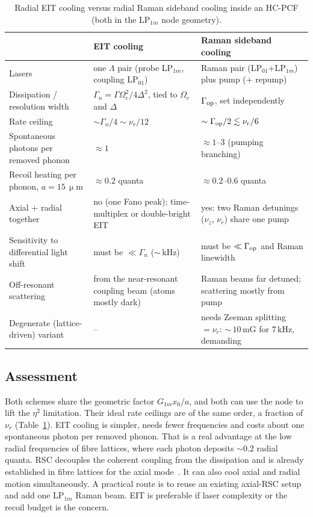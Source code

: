 \documentclass[11pt,a4paper]{article}
\newcommand{\micrometre}{\upmu m}\newcommand{\microkelvin}{\upmu K}
\newcommand{\SI}[2]{\ensuremath{#1\,\mathrm{#2}}}
\newcommand{\Om}{\Omega}
\begin{document}
\begin{table}[t]
\centering
\caption{Radial EIT cooling versus radial Raman sideband cooling inside an HC-PCF (both in the LP$_{1m}$ node geometry).}
\label{tab:compare}
\small
\begin{tabular}{p{4.0cm}p{5.2cm}p{5.2cm}}
\toprule
& EIT cooling & Raman sideband cooling\\
\midrule
Lasers & one $\Lambda$ pair (probe LP$_{1m}$, coupling LP$_{01}$) & Raman pair (LP$_{01}$+LP$_{1m}$) plus pump (+ repump)\\
Dissipation / resolution width & $\Gamma_n=\Gamma\Om_c^2/4\Delta^2$, tied to $\Om_c$ and $\Delta$ & $\Gamma_{\rm op}$, set independently\\
Rate ceiling & $\sim\Gamma_n/4\sim\nu_r/12$ & $\sim\Gamma_{\rm op}/2\lesssim\nu_r/6$\\
Spontaneous photons per removed phonon & $\approx1$ & $\approx1$--3 (pumping branching)\\
Recoil heating per phonon, $a=\SI{15}{\micrometre}$ & $\approx0.2$ quanta & $\approx0.2$--$0.6$ quanta\\
Axial + radial together & no (one Fano peak); time-multiplex or double-bright EIT~\cite{scharnhorst2018} & yes: two Raman detunings ($\nu_z$, $\nu_r$) share one pump\\
Sensitivity to differential light shift & must be $\ll\Gamma_n$ ($\sim$\,kHz) & must be $\ll\Gamma_{\rm op}$ and Raman linewidth\\
Off-resonant scattering & from the near-resonant coupling beam (atoms mostly dark) & Raman beams far detuned; scattering mostly from pump\\
Degenerate (lattice-driven) variant & -- & needs Zeeman splitting $=\nu_r$: $\sim$\,\SI{10}{mG} for \SI{7}{kHz}, demanding\\
\bottomrule
\end{tabular}
\end{table}

\subsection{Assessment}
Both schemes share the geometric factor $G_{1m}x_0/a$, and both can use the node to lift the $\eta^2$ limitation. Their ideal rate ceilings are of the same order, a fraction of $\nu_r$ (Table~\ref{tab:compare}). EIT cooling is simpler, needs fewer frequencies and costs about one spontaneous photon per removed phonon. That is a real advantage at the low radial frequencies of fibre lattices, where each photon deposits $\sim0.2$ radial quanta. RSC decouples the coherent coupling from the dissipation and is already established in fibre lattices for the axial mode~\cite{leong2020}. It can also cool axial and radial motion simultaneously. A practical route is to reuse an existing axial-RSC setup and add one LP$_{1m}$ Raman beam. EIT is preferable if laser complexity or the recoil budget is the concern.
\end{document}
